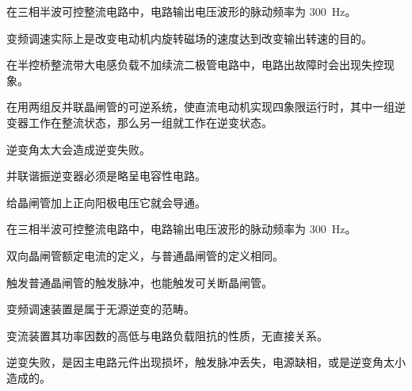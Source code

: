 \documentclass[电力电子]{subfiles}
\begin{document}
	\begin{ti}
		在三相半波可控整流电路中，电路输出电压波形的脉动频率为 \SI{300}{Hz}。\cuo
	\end{ti}

	\begin{ti}
		变频调速实际上是改变电动机内旋转磁场的速度达到改变输出转速的目的。\dui
	\end{ti}

	\begin{ti}
		在半控桥整流带大电感负载不加续流二极管电路中，电路出故障时会出现失控现象。\dui
	\end{ti}

	\begin{ti}
		在用两组反并联晶闸管的可逆系统，使直流电动机实现四象限运行时，其中一组逆变器工作在整流状态，那么另一组就工作在逆变状态。\cuo
	\end{ti}

	\begin{ti}
		逆变角太大会造成逆变失败。\cuo
	\end{ti}

	\begin{ti}
		并联谐振逆变器必须是略呈电容性电路。\cuo
	\end{ti}

	\begin{ti}
		给晶闸管加上正向阳极电压它就会导通。\cuo
	\end{ti}

	\begin{ti}
		在三相半波可控整流电路中，电路输出电压波形的脉动频率为 \SI{300}{Hz}。\cuo
	\end{ti}

	\begin{ti}
		双向晶闸管额定电流的定义，与普通晶闸管的定义相同。\cuo
	\end{ti}

	\begin{ti}
		触发普通晶闸管的触发脉冲，也能触发可关断晶闸管。\cuo
	\end{ti}

	\begin{ti}
		变频调速装置是属于无源逆变的范畴。\cuo
	\end{ti}

	\begin{ti}
		变流装置其功率因数的高低与电路负载阻抗的性质，无直接关系。\cuo
	\end{ti}

	\begin{ti}
		逆变失败，是因主电路元件出现损坏，触发脉冲丢失，电源缺相，或是逆变角太小造成的。\dui
	\end{ti}
\end{document}
